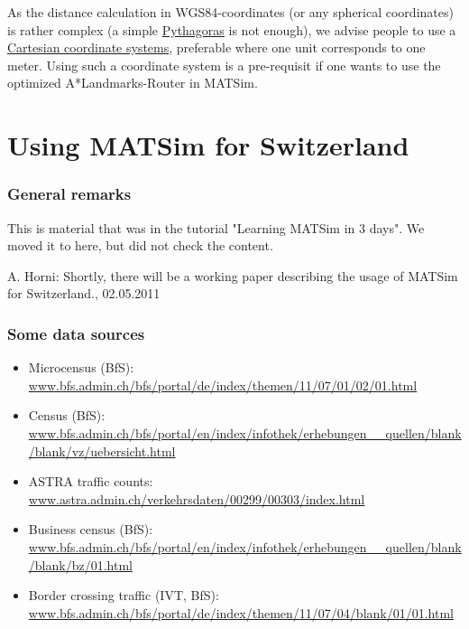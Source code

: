 \documentclass[a4paper,11pt]{report}
\begin{document}
As the distance calculation in WGS84-coordinates (or any spherical coordinates) is rather complex (a simple \href{http://en.wikipedia.org/wiki/Pythagorean_theorem}{Pythagoras} is not enough), we advise people to use a \href{http://en.wikipedia.org/wiki/Coordinate_system}{Cartesian coordinate systems},  preferable where one unit corresponds to one meter. Using such a  coordinate system is a pre-requisit if one wants to use the optimized  A*Landmarks-Router in MATSim.

\vfill\eject
\section{Using MATSim for Switzerland}

\subsubsection{General remarks}

This is material that was in the tutorial "Learning MATSim in 3 days". We moved it to here, but did not check the content.

A. Horni: Shortly, there will be a working paper describing the usage of MATSim for Switzerland., 02.05.2011

\subsubsection{Some data sources}
\begin{itemize}
	\item Microcensus (BfS): \href{http://www.bfs.admin.ch/bfs/portal/de/index/themen/11/07/01/02/01.html}{www.bfs.admin.ch/bfs/portal/de/index/themen/11/07/01/02/01.html}
	\item Census (BfS): \href{http://www.bfs.admin.ch/bfs/portal/en/index/infothek/erhebungen__quellen/blank/blank/vz/uebersicht.html}{www.bfs.admin.ch/bfs/portal/en/index/infothek/erhebungen\_\_quellen/blank/blank/vz/uebersicht.html}
	\item ASTRA traffic counts: \href{http://www.astra.admin.ch/verkehrsdaten/00299/00303/index.html?lang=en}{www.astra.admin.ch/verkehrsdaten/00299/00303/index.html}
	\item Business census (BfS): \href{http://www.bfs.admin.ch/bfs/portal/en/index/infothek/erhebungen__quellen/blank/blank/bz/01.html}{www.bfs.admin.ch/bfs/portal/en/index/infothek/erhebungen\_\_quellen/blank/blank/bz/01.html}
	\item Border crossing traffic (IVT, BfS): \href{http://www.bfs.admin.ch/bfs/portal/de/index/themen/11/07/04/blank/01/01.html}{www.bfs.admin.ch/bfs/portal/de/index/themen/11/07/04/blank/01/01.html}
\end{itemize}
\end{document}
